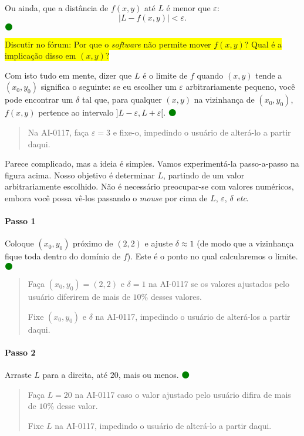 \documentclass[fleqn,12pt]{article}
\newenvironment{ct}{\begin{quotation}\color{red!30!black}\sffamily\small}{\end{quotation}} %
\newcommand\foreign[1]{\textsl{#1}}
\newcommand\etc{\foreign{etc}}
\newcommand\proceed{\textcolor{green}{$\medbullet$}\xspace}
\newcommand\pt{\ensuremath{(x,y)}\xspace}
\newcommand\ptzero{\ensuremath{(x_0,y_0)}\xspace}
\newcommand\forum[1]{\colorbox{yellow}{Discutir no fórum: #1}}
\begin{document}
    Ou ainda, que a distância de $f(x,y)$ até $L$ é menor que $\varepsilon$:
    \begin{equation*}
	|L - f(x,y)| < \varepsilon.
    \end{equation*} \proceed

    \forum{Por que o \foreign{software} não permite mover $f(x,y)$? Qual é a implicação disso em $(x,y)$?}

    Com isto tudo em mente, dizer que $L$ é o limite de $f$ quando \pt tende a \ptzero significa o seguinte: se eu escolher um $\varepsilon$ arbitrariamente pequeno, você pode encontrar um $\delta$ tal que, para qualquer \pt na vizinhança de \ptzero, $f(x,y)$ pertence ao intervalo $]L - \varepsilon, L + \varepsilon[$. \proceed

    \begin{ct}
	Na AI-0117, faça $\varepsilon = 3$ e fixe-o, impedindo o usuário de alterá-lo a partir daqui.	
    \end{ct}

    Parece complicado, mas a ideia é simples. Vamos experimentá-la passo-a-passo na figura acima. Nosso objetivo é determinar $L$, partindo de um valor arbitrariamente escolhido. Não é necessário preocupar-se com valores numéricos, embora você possa vê-los passando o \foreign{mouse} por cima de $L$, $\varepsilon$, $\delta$ \etc.

    \paragraph{Passo 1} Coloque \ptzero próximo de $(2,2)$ e ajuste $\delta \approx 1$ (de modo que a vizinhança fique toda dentro do domínio de $f$). Este é o ponto no qual calcularemos o limite. \proceed

    \begin{ct}
	Faça $\ptzero = (2,2)$ e $\delta = 1$ na AI-0117 se os valores ajustados pelo usuário diferirem de mais de $10\%$ desses valores.

	Fixe \ptzero e $\delta$ na AI-0117, impedindo o usuário de alterá-los a partir daqui.
    \end{ct}

    \paragraph{Passo 2} Arraste $L$ para a direita, até $20$, mais ou menos. \proceed

    \begin{ct}
	Faça $L = 20$ na AI-0117 caso o valor ajustado pelo usuário difira de mais de $10\%$ desse valor.

	Fixe $L$ na AI-0117, impedindo o usuário de alterá-lo a partir daqui.
    \end{ct}
\end{document}
